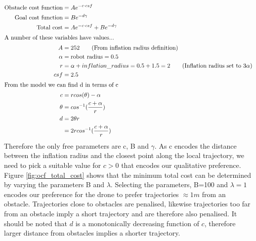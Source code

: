 \documentclass[capstone_report.tex]{subfiles}
\begin{document}
\begin{align*}
    \text{Obstacle cost function} &=  Ae^{-c\cdot csf}\\
    \text{Goal cost function} &=    Be^{-d\gamma}\\
    \text{Total cost} &=  Ae^{-c\cdot csf} + Be^{-d\gamma}\\
    \intertext{A number of these variables have values...}
    A &=    252 \tag{\text{From inflation radius definition}}\\
    \alpha &=    \text{robot radius} = 0.5\\
    r &=    \alpha + inflation\_radius = 0.5 + 1.5 = 2\tag{\text{Inflation radius set to 3$\alpha$}}\\
    csf &= 2.5\\
    \intertext{From the model we can find d in terms of c}
    c   &=    rcos(\theta) - \alpha\\
    \theta &=   cos^{-1}(\frac{c+\alpha}{r})\\
    d   &=    2\theta r\\
        &=    2rcos^{-1}(\frac{c+\alpha}{r})\\
\end{align*}
Therefore the only free parameters are c, B and $\gamma$.  As c encodes the distance between the inflation radius and the closest point along the local trajectory, we need to pick a suitable value for $c>0$ that encodes our qualitative preference.  Figure \ref{fig:ocf_total_cost} shows that the minimum total cost can be determined by varying the parameters B and $\lambda$.  Selecting the parameters, B=100 and $\lambda=1$ encodes our preference for the drone to prefer trajectories $\approx 1m$ from an obstacle.  Trajectories close to obstacles are penalised, likewise trajectories too far from an obstacle imply a short trajectory and are therefore also penalised.  It should be noted that $d$ is a monotonically decreasing function of $c$, therefore larger distance from obstacles implies a shorter trajectory.
\end{document}
